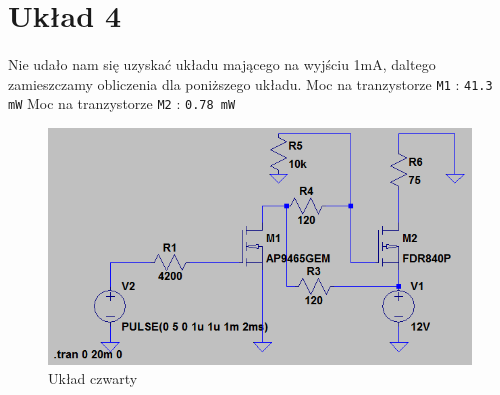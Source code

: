 \documentclass[wide,a4paper,titlepage,12pt] {article}
\begin{document}
  \section{Układ 4}
  \paragraph{}
  Nie udało nam się uzyskać układu mającego na wyjściu 1mA, daltego zamieszczamy obliczenia dla poniższego układu.
  Moc na tranzystorze \texttt{M1} : \texttt{41.3 mW}
  Moc na tranzystorze \texttt{M2} : \texttt{0.78 mW}

  \begin{figure}[h!]
  \begin{center}
  \includegraphics[scale=.5]{p4.png}
  \caption{Układ czwarty}
  \label{fig:main}
  \end{center}
  \end{figure}
\end{document}
